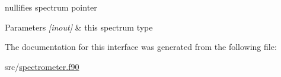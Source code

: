 nullifies spectrum pointer 


\begin{DoxyParams}{Parameters}
{\em \mbox{[}inout\mbox{]}} & this spectrum type \\
\hline
\end{DoxyParams}


The documentation for this interface was generated from the following file\-:\begin{DoxyCompactItemize}
\item 
src/\hyperlink{spectrometer_8f90}{spectrometer.\-f90}\end{DoxyCompactItemize}

